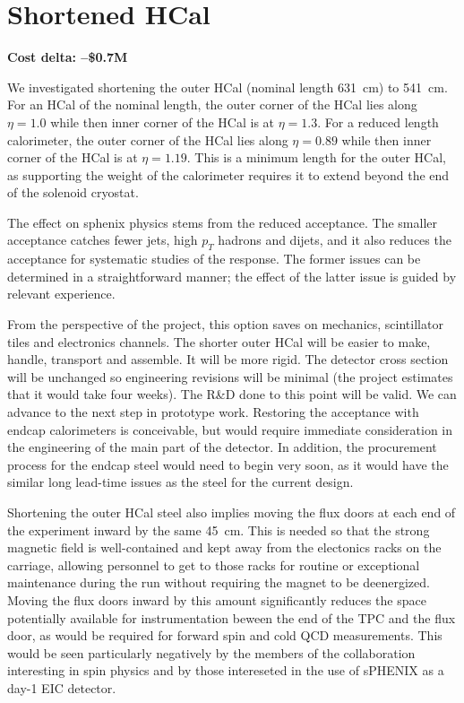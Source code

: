 \section*{Shortened HCal}
\label{ohcal_short}

\textbf{Cost delta: --\$0.7M}
 
We investigated shortening the outer HCal (nominal length 631~cm) to
541~cm.  For an HCal of the nominal length, the outer corner of the
HCal lies along $\eta = 1.0$ while then inner corner of the HCal is at
$\eta = 1.3$.  For a reduced length calorimeter, the outer corner of
the HCal lies along $\eta = 0.89$ while then inner corner of the HCal
is at $\eta = 1.19$.  This is a minimum length for the outer HCal, as
supporting the weight of the calorimeter requires it to extend beyond
the end of the solenoid cryostat.

The effect on sphenix physics stems from the reduced acceptance.  The
smaller acceptance catches fewer jets, high $p_T$ hadrons and dijets,
and it also reduces the acceptance for systematic studies of the
response.  The former issues can be determined in a straightforward
manner; the effect of the latter issue is guided by relevant
experience.

From the perspective of the project, this option saves on mechanics,
scintillator tiles and electronics channels.  The shorter outer HCal
will be easier to make, handle, transport and assemble.  It will be
more rigid.  The detector cross section will be unchanged so
engineering revisions will be minimal (the project estimates that it
would take four weeks). The R\&D done to this point will be valid.  We
can advance to the next step in prototype work.  Restoring the
acceptance with endcap calorimeters is conceivable, but would require
immediate consideration in the engineering of the main part of the
detector.  In addition, the procurement process for the endcap steel
would need to begin very soon, as it would have the similar long
lead-time issues as the steel for the current design.

Shortening the outer HCal steel also implies moving the flux doors at
each end of the experiment inward by the same 45~cm.  This is needed
so that the strong magnetic field is well-contained and kept away from
the electonics racks on the carriage, allowing personnel to get to
those racks for routine or exceptional maintenance during the run
without requiring the magnet to be deenergized.  Moving the flux doors
inward by this amount significantly reduces the space potentially
available for instrumentation beween the end of the TPC and the flux
door, as would be required for forward spin and cold QCD measurements.
This would be seen particularly negatively by the members of the
collaboration interesting in spin physics and by those intereseted in
the use of sPHENIX as a day-1 EIC detector.
